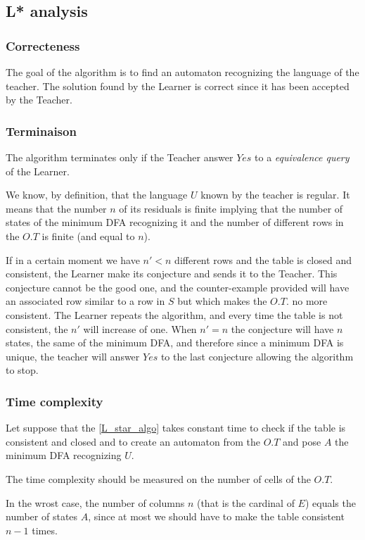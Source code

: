 \subsection{L* analysis}
\subsubsection{Correcteness}
The goal of the algorithm is to find an automaton recognizing the language of the teacher. The solution found by the Learner is correct since it has been accepted by the Teacher.
\subsubsection{Terminaison}
The algorithm terminates only if the Teacher answer $Yes$ to a \textit{equivalence query} of the Learner.

We know, by definition, that the language $U$ known by the teacher is regular. It means that the number $n$ of its residuals is finite implying that the number of states of the minimum DFA recognizing it and the number of different rows in the $O.T$ is finite (and equal to $n$).

If in a certain moment we have $n' < n$ different rows and the table is closed and consistent, the Learner make its conjecture and sends it to the Teacher. This conjecture cannot be the good one, and the counter-example provided will have an associated row similar to a row in $S$ but which makes the $O.T.$ no more consistent. The Learner repeats the algorithm, and every time the table is not consistent, the $n'$ will increase of one. When $n' = n$ the conjecture will have $n$ states, the same of the minimum DFA, and therefore since a minimum DFA is unique, the teacher will answer $Yes$ to the last conjecture allowing the algorithm to stop.

\subsubsection{Time complexity}
Let suppose that the \cref{L_star_algo} takes constant time to check if the table is consistent and closed and to create an automaton from the $O.T$ and pose $A$ the minimum DFA recognizing $U$.

The time complexity should be measured on the number of cells of the $O.T$.

In the wrost case, the number of columns $n$ (that is the cardinal of $E$) equals the number of states $A$, since at most we should have to make the table consistent $n-1$ times.

